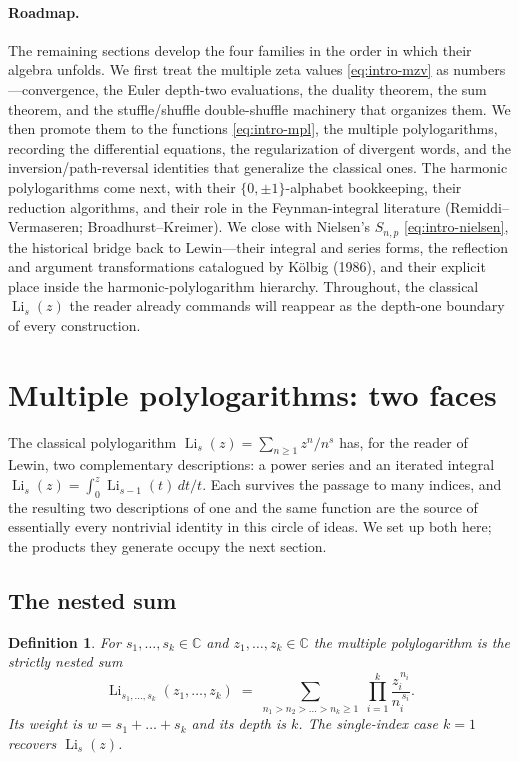 \documentclass[11pt]{article}
\DeclareMathOperator{\Li}{Li}
\theoremstyle{plain}
\newtheorem{definition}[theorem]{Definition}
\theoremstyle{remark}
\begin{document}
\medskip
\paragraph{Roadmap.}
The remaining sections develop the four families in the order in which their
algebra unfolds. We first treat the multiple zeta values \eqref{eq:intro-mzv} as
numbers—convergence, the Euler depth-two evaluations, the duality theorem, the sum
theorem, and the stuffle/shuffle double-shuffle machinery that organizes them. We
then promote them to the functions \eqref{eq:intro-mpl}, the multiple
polylogarithms, recording the differential equations, the regularization of
divergent words, and the inversion/path-reversal identities that generalize the
classical ones. The harmonic polylogarithms come next, with their
$\{0,\pm1\}$-alphabet bookkeeping, their reduction algorithms, and their role in
the Feynman-integral literature (Remiddi--Vermaseren; Broadhurst--Kreimer). We
close with Nielsen's $S_{n,p}$ \eqref{eq:intro-nielsen}, the historical bridge
back to Lewin—their integral and series forms, the reflection and argument
transformations catalogued by K\"olbig (1986), and their explicit place inside the
harmonic-polylogarithm hierarchy. Throughout, the classical $\Li_s(z)$ the reader
already commands will reappear as the depth-one boundary of every construction.


\section{Multiple polylogarithms: two faces}

The classical polylogarithm $\Li_s(z)=\sum_{n\ge1}z^n/n^s$ has, for the reader of Lewin, two complementary descriptions: a power series and an iterated integral $\Li_s(z)=\int_0^z\Li_{s-1}(t)\,dt/t$. Each survives the passage to many indices, and the resulting two descriptions of one and the same function are the source of essentially every nontrivial identity in this circle of ideas. We set up both here; the products they generate occupy the next section.

\subsection{The nested sum}

\begin{definition}
For $s_1,\dots,s_k\in\mathbb{C}$ and $z_1,\dots,z_k\in\mathbb{C}$ the \emph{multiple polylogarithm} is the strictly nested sum
\[
  \Li_{s_1,\dots,s_k}(z_1,\dots,z_k)
  \;=\;\sum_{n_1>n_2>\dots>n_k\ge1}\;\prod_{i=1}^{k}\frac{z_i^{\,n_i}}{n_i^{\,s_i}} .
\]
Its \emph{weight} is $w=s_1+\dots+s_k$ and its \emph{depth} is $k$. The single-index case $k=1$ recovers $\Li_s(z)$.
\end{definition}
\end{document}
